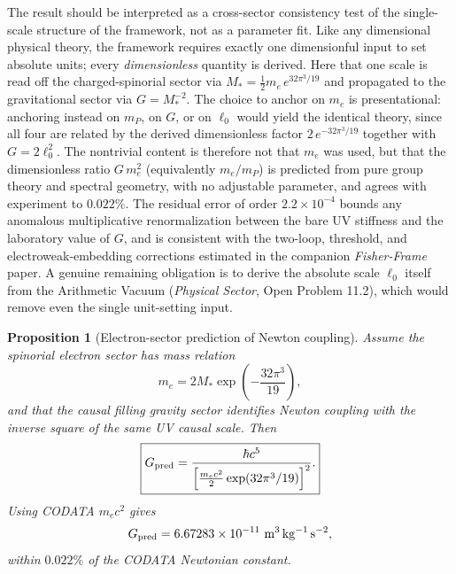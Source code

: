 \documentclass[11pt]{article}
\newtheorem{proposition}[definition]{Proposition}
\begin{document}
The result should be interpreted as a cross-sector consistency test of the single-scale structure of the framework, not as a parameter fit. Like any dimensional physical theory, the framework requires exactly one dimensionful input to set absolute units; every \emph{dimensionless} quantity is derived. Here that one scale is read off the charged-spinorial sector via $M_*=\tfrac{1}{2}m_e\,e^{32\pi^3/19}$ and propagated to the gravitational sector via $G=M_*^{-2}$. The choice to anchor on $m_e$ is presentational: anchoring instead on $m_P$, on $G$, or on $\ell_0$ would yield the identical theory, since all four are related by the derived dimensionless factor $2\,e^{-32\pi^3/19}$ together with $G=2\ell_0^2$. The nontrivial content is therefore not that $m_e$ was used, but that the dimensionless ratio $G\,m_e^2$ (equivalently $m_e/m_P$) is predicted from pure group theory and spectral geometry, with no adjustable parameter, and agrees with experiment to $0.022\%$. The residual error of order $2.2\times10^{-4}$ bounds any anomalous multiplicative renormalization between the bare UV stiffness and the laboratory value of $G$, and is consistent with the two-loop, threshold, and electroweak-embedding corrections estimated in the companion \emph{Fisher-Frame} paper. A genuine remaining obligation is to derive the absolute scale $\ell_0$ itself from the Arithmetic Vacuum (\emph{Physical Sector}, Open Problem 11.2), which would remove even the single unit-setting input.

\begin{proposition}[Electron-sector prediction of Newton coupling]
Assume the spinorial electron sector has mass relation
\begin{equation}
 m_e=2M_*\exp\left(-\frac{32\pi^3}{19}\right),
\end{equation}
and that the causal filling gravity sector identifies Newton coupling with the inverse square of the same UV causal scale. Then
\begin{equation}
\boxed{G_{\rm pred}=\frac{\hbar c^5}{\left[\frac{m_ec^2}{2}\exp(32\pi^3/19)\right]^2}.}
\end{equation}
Using CODATA $m_ec^2$ gives
\begin{equation}
G_{\rm pred}=6.67283\times10^{-11}\ {\rm m^3\,kg^{-1}\,s^{-2}},
\end{equation}
within $0.022\%$ of the CODATA Newtonian constant.
\end{proposition}
\end{document}
